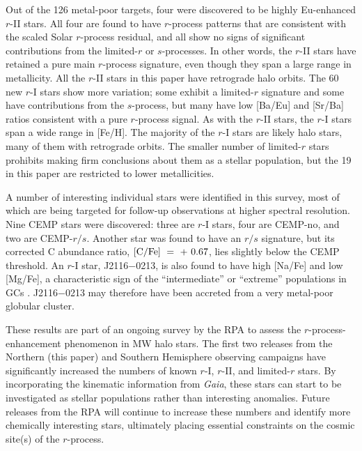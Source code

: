 \documentclass[preprint]{aastex61}
\begin{document}
Out of the 126 metal-poor targets, four were discovered to be
highly Eu-enhanced $r$-II stars.  All four are found to have
$r$-process patterns that are consistent with the scaled Solar
$r$-process residual, and all show no signs of significant
contributions from the limited-$r$ or $s$-processes.  In other words,
the $r$-II stars have retained a pure main $r$-process signature, even
though they span a large range in metallicity.  All the $r$-II stars
in this paper have retrograde halo orbits.  The 60 new $r$-I stars
show more variation; some exhibit a limited-$r$ signature and some
have contributions from the $s$-process, but many have low [Ba/Eu] and
[Sr/Ba] ratios consistent with a pure $r$-process signal.  As with the
$r$-II stars, the $r$-I stars span a wide range in [Fe/H].  The
majority of the $r$-I stars are likely halo stars, many of them with
retrograde orbits.  The smaller number of limited-$r$ stars prohibits
making firm conclusions about them as a stellar population, but the 19
in this paper are restricted to lower metallicities.

A number of interesting individual stars were identified in this
survey, most of which are being targeted for follow-up observations at
higher spectral resolution.  Nine CEMP stars were discovered:
three are $r$-I stars, four are CEMP-no, and two are CEMP-$r/s$.
Another star was found to have an $r/s$ signature, but its corrected C
abundance ratio, $[\rm{C/Fe}]~=~+~0.67$, lies slightly below the CEMP
threshold. An $r$-I star, J2116$-$0213, is also found to have high
[Na/Fe] and low [Mg/Fe], a characteristic sign
of the ``intermediate'' or ``extreme'' populations in GCs
\citep{Carretta2009}.  J2116$-$0213 may therefore have been accreted
from a very metal-poor globular cluster.

These results are part of an ongoing survey by the RPA to assess the
$r$-process-enhancement phenomenon in MW halo stars.  The first two
releases from the Northern (this paper) and Southern Hemisphere
\citep{Hansen2018} observing campaigns have significantly increased
the numbers of known $r$-I, $r$-II, and limited-$r$ stars. By
incorporating the kinematic information from {\it Gaia}, these stars
can start to be investigated as stellar populations rather than
interesting anomalies.  Future releases from the RPA will continue to
increase these numbers and identify more chemically interesting stars,
ultimately placing essential constraints on the cosmic site(s) of the
$r$-process.
\end{document}
